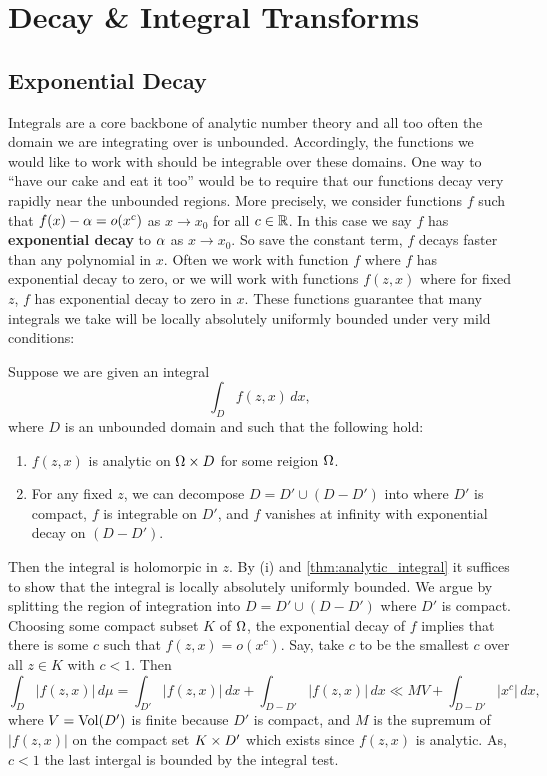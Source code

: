     \section{Decay \& Integral Transforms}
      \subsection*{Exponential Decay}
        Integrals are a core backbone of analytic number theory and all too often the domain we are integrating over is unbounded. Accordingly, the functions we would like to work with should be integrable over these domains. One way to ``have our cake and eat it too'' would be to require that our functions decay very rapidly near the unbounded regions. More precisely, we consider functions $f$ such that $f(x)-\alpha = o(x^{c})$ as $x \to x_{0}$ for all $c \in \mathbb{R}$. In this case we say $f$ has \textbf{exponential decay} to $\alpha$ as $x \to x_{0}$. So save the constant term, $f$ decays faster than any polynomial in $x$. Often we work with function $f$ where $f$ has exponential decay to zero, or we will work with functions $f(z,x)$ where for fixed $z$, $f$ has exponential decay to zero in $x$. These functions guarantee that many integrals we take will be locally absolutely uniformly bounded under very mild conditions:

        \begin{method}\label{met:decay_compacta_integral}
          Suppose we are given an integral
          \[
            \int_{D}f(z,x)\,dx,
          \]
          where $D$ is an unbounded domain and such that the following hold:
          \begin{enumerate}[label=(\roman*)]
            \item $f(z,x)$ is analytic on $\Omega \times D$ for some reigion $\Omega$.
            \item For any fixed $z$, we can decompose $D = D' \cup (D-D')$ into where $D'$ is compact, $f$ is integrable on $D'$, and $f$ vanishes at infinity with exponential decay on $(D-D')$.
          \end{enumerate}
          Then the integral is holomorpic in $z$. By (i) and \cref{thm:analytic_integral} it suffices to show that the integral is locally absolutely uniformly bounded. We argue by splitting the region of integration into $D = D' \cup (D-D')$ where $D'$ is compact. Choosing some compact subset $K$ of $\Omega$, the exponential decay of $f$ implies that there is some $c$ such that $f(z,x) = o\left(x^{c}\right)$. Say, take $c$ to be the smallest $c$ over all $z \in K$ with $c < 1$. Then
          \[
            \int_{D}|f(z,x)|\,d\mu = \int_{D'}|f(z,x)|\,dx+\int_{D-D'}|f(z,x)|\,dx \ll MV+\int_{D-D'}\left|x^{c}\right|\,dx,
          \]
          where $V = \operatorname{\mathrm{Vol}}(D')$ is finite because $D'$ is compact, and $M$ is the supremum of $|f(z,x)|$ on the compact set $K \times D'$ which exists since $f(z,x)$ is analytic. As, $c < 1$ the last intergal is bounded by the integral test.
        \end{method}

